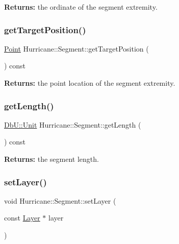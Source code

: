 {\bfseries Returns\+:} the ordinate of the segment extremity. \mbox{\label{classHurricane_1_1Segment_af24bee306be3461bb5dd1ba680f2a2df}} 
\subsubsection{\texorpdfstring{get\+Target\+Position()}{getTargetPosition()}}
{\footnotesize\ttfamily \mbox{\hyperlink{classHurricane_1_1Point}{Point}} Hurricane\+::\+Segment\+::get\+Target\+Position (\begin{DoxyParamCaption}{ }\end{DoxyParamCaption}) const\hspace{0.3cm}{\ttfamily [virtual]}}

{\bfseries Returns\+:} the point location of the segment extremity. \mbox{\label{classHurricane_1_1Segment_a9f6c42c2de0330aa6a486cdbf550cea1}} 
\subsubsection{\texorpdfstring{get\+Length()}{getLength()}}
{\footnotesize\ttfamily \mbox{\hyperlink{group__DbUGroup_ga4fbfa3e8c89347af76c9628ea06c4146}{Db\+U\+::\+Unit}} Hurricane\+::\+Segment\+::get\+Length (\begin{DoxyParamCaption}{ }\end{DoxyParamCaption}) const\hspace{0.3cm}{\ttfamily [pure virtual]}}

{\bfseries Returns\+:} the segment length. \mbox{\label{classHurricane_1_1Segment_acd0b0cd25c824ba7f3b1ff2776c97cf1}} 
\subsubsection{\texorpdfstring{set\+Layer()}{setLayer()}}
{\footnotesize\ttfamily void Hurricane\+::\+Segment\+::set\+Layer (\begin{DoxyParamCaption}\item[{const \mbox{\hyperlink{classHurricane_1_1Layer}{Layer}} $\ast$}]{layer }\end{DoxyParamCaption})}

